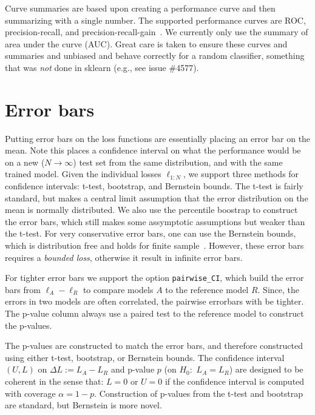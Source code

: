 \documentclass{article}
\newcommand{\code}{\texttt}
\begin{document}
Curve summaries are based upon creating a performance curve and then summarizing with a single number.
The supported performance curves are ROC, precision-recall, and precision-recall-gain~\citep{Flach2015}.
We currently only use the summary of area under the curve (AUC)\@.
Great care is taken to ensure these curves and summaries and unbiased and behave correctly for a random classifier, something that was \emph{not} done in sklearn (e.g., see issue \#4577)\@.

\section{Error bars}

Putting error bars on the loss functions are essentially placing an error bar on the mean.
Note this places a confidence interval on what the performance would be on a new ($N \rightarrow \infty$) test set from the same distribution, and with the same trained model.
Given the individual losses $\ell_{1:N}$, we support three methods for confidence intervals: t-test, bootstrap, and Bernstein bounds.
The t-test is fairly standard, but makes a central limit assumption that the error distribution on the mean is normally distributed.
We also use the percentile boostrap to construct the error bars, which still makes some assymptotic assumptions but weaker than the t-test.
For very conservative error bars, one can use the Bernstein bounds, which is distribution free and holds for finite sample~\citep{Audibert2009}.
However, these error bars requires a \emph{bounded loss}, otherwise it result in infinite error bars.

For tighter error bars we support the option \code{pairwise\_CI}, which build the error bars from $\ell_A - \ell_R$ to compare models $A$ to the reference model $R$.
Since, the errors in two models are often correlated, the pairwise errorbars with be tighter.
The p-value column always use a paired test to the reference model to construct the p-values.

The p-values are constructed to match the error bars, and therefore constructed using either t-test, bootstrap, or Bernstein bounds.
The confidence interval $(U,L)$ on $\Delta L := L_A - L_R$ and p-value $p$ (on $H_0$:~$L_A = L_R$) are designed to be coherent in the sense that: $L = 0$ or $U = 0$ if the confidence interval is computed with coverage $\alpha=1-p$.
Construction of p-values from the t-test and bootstrap are standard, but Bernstein is more novel.
\end{document}
